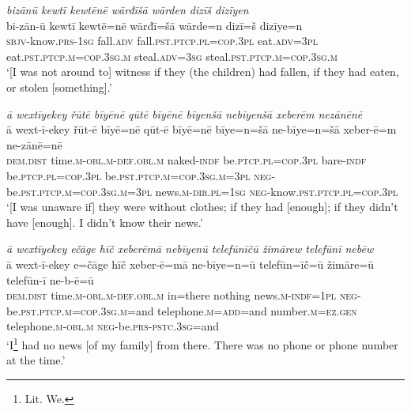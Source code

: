 \ea \label{ŽM.29}
\textit{bizānū kewtī kewtēnē wārđīšā wārden dizīš dizīyen} \\ 
\gll bi-zān-ū kewtī kewtē=nē wārđī=šā wārde=n dizī=š dizīye=n \\ 
 \textsc{sbjv-}know\textsc{.prs}\textsc{-\textsc{1sg}} fall\textsc{.adv} fall\textsc{.pst}\textsc{.ptcp}\textsc{.pl}\textsc{=cop}\textsc{.3pl} eat\textsc{.adv}\textsc{=3pl} eat\textsc{.pst}\textsc{.ptcp}\textsc{.m}\textsc{=cop}\textsc{.3sg}\textsc{.m} steal\textsc{.adv}\textsc{=3sg} steal\textsc{.pst}\textsc{.ptcp}\textsc{.m}\textsc{=cop}\textsc{.3sg}\textsc{.m} \\ 
\glt `[I was not around to] witness if they (the children) had fallen, if they had eaten, or stolen [something].'
\z 
 
\ea \label{ŽM.30}
\textit{ā wextīyekey řūtē bīyēnē qūtē bīyēnē bīyenšā nebīyenšā xeberēm nezānēnē} \\ 
\gll ā wext-ī-ekey řūt-ē bīyē=nē qūt-ē bīyē=nē bīye=n=šā ne-bīye=n=šā xeber-ē=m ne-zānē=nē \\ 
 \textsc{dem.dist} time\textsc{.m}\textsc{-obl}\textsc{.m}\textsc{-def}\textsc{.obl}\textsc{.m} naked\textsc{-indf} be\textsc{.ptcp}\textsc{.pl}\textsc{=cop}\textsc{.3pl} bare\textsc{-indf} be\textsc{.ptcp}\textsc{.pl}\textsc{=cop}\textsc{.3pl} be\textsc{.pst}\textsc{.ptcp}\textsc{.m}\textsc{=cop}\textsc{.3sg}\textsc{.m}\textsc{=3pl} \textsc{neg-}be\textsc{.pst}\textsc{.ptcp}\textsc{.m}\textsc{=cop}\textsc{.3sg}\textsc{.m}\textsc{=3pl} news\textsc{.m}\textsc{-dir}\textsc{.pl}\textsc{=\textsc{1sg}} \textsc{neg-}know\textsc{.pst}\textsc{.ptcp}\textsc{.pl}\textsc{=cop}\textsc{.3pl} \\ 
\glt `[I was unaware if] they were without clothes; if they had [enough]; if they didn’t have [enough]. I didn't know their news.'
\z 
 
\ea \label{ŽM.32}
\textit{ā wextīyekey ečāge hīč xeberēmā nebīyenū telefūnīčū žimārew telefūnī nebēw} \\ 
\gll ā wext-ī-ekey e=čāge hīč xeber-ē=mā ne-bīye=n=ū telefūn=īč=ū žimāre=ū telefūn-ī ne-b-ē=ū \\ 
 \textsc{dem.dist} time\textsc{.m}\textsc{-obl}\textsc{.m}\textsc{-def}\textsc{.obl}\textsc{.m} in=there nothing news\textsc{.m}\textsc{-indf}\textsc{=\textsc{1pl}} \textsc{neg-}be\textsc{.pst}\textsc{.ptcp}\textsc{.m}\textsc{=cop}\textsc{.3sg}\textsc{.m}=and telephone\textsc{.m}\textsc{=add}=and number\textsc{.m}\textsc{=ez.gen} telephone\textsc{.m}\textsc{-obl}\textsc{.m} \textsc{neg-}be\textsc{.prs}\textsc{-pstc}\textsc{.3sg}=and \\ 
\glt `I\footnote{Lit. We.}  had no news [of my family] from there. There was no phone or phone number at the time.'
\z 
 
